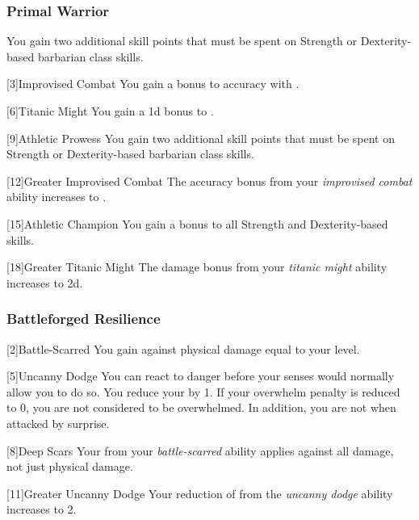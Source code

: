         \subsubsection{Primal Warrior}
             You gain two additional skill points that must be spent on Strength or Dexterity-based barbarian class skills.

            [3]{Improvised Combat} You gain a  bonus to accuracy with .

            [6]{Titanic Might}
            You gain a \plus1d bonus to .

            [9]{Athletic Prowess} You gain two additional skill points that must be spent on Strength or Dexterity-based barbarian class skills.

            [12]{Greater Improvised Combat} 
            The accuracy bonus from your \textit{improvised combat} ability increases to .

            [15]{Athletic Champion}
            You gain a  bonus to all Strength and Dexterity-based skills.

            [18]{Greater Titanic Might}
            The damage bonus from your \textit{titanic might} ability increases to \plus2d.

        \subsubsection{Battleforged Resilience}
            [2]{Battle-Scarred} You gain  against physical damage equal to your level.

            [5]{Uncanny Dodge} You can react to danger before your senses would normally allow you to do so.
            You reduce your  by 1.
            If your overwhelm penalty is reduced to 0, you are not considered to be overwhelmed.
            In addition, you are not \unaware when attacked by surprise.

            [8]{Deep Scars} Your  from your \textit{battle-scarred} ability applies against all damage, not just physical damage.

            [11]{Greater Uncanny Dodge}
            Your reduction of  from the \textit{uncanny dodge} ability increases to 2.

